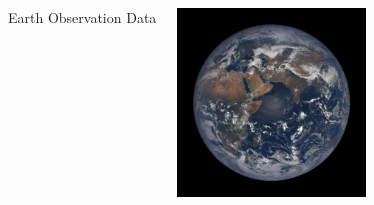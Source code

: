 

{
	\begin{frame}[plain]
	
	\vfill
	\Huge\color{white}
	\begin{center}
		\begin{columns}
			\vspace{7em}
			
			\hfill 
			Earth Observation Data
			
			\includegraphics[width=5cm]{images/epic1}
		\end{columns}
	\end{center}
	
	\vfill
\end{frame}
}

